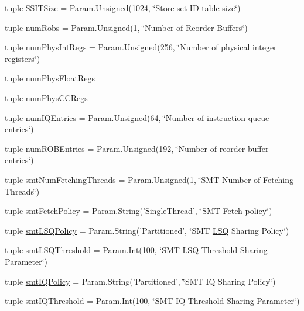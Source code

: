\begin{DoxyCompactItemize}
tuple \hyperlink{classO3CPU_1_1DerivO3CPU_aaae81435109fd5abd8db9e1cac852536}{SSITSize} = Param.Unsigned(1024, \char`\"{}Store set ID table size\char`\"{})
\item 
tuple \hyperlink{classO3CPU_1_1DerivO3CPU_afa45ebeb163c7058a6ba074b27187095}{numRobs} = Param.Unsigned(1, \char`\"{}Number of Reorder Buffers\char`\"{})
\item 
tuple \hyperlink{classO3CPU_1_1DerivO3CPU_a4872233fcf1f251c1065c07bf3d288b4}{numPhysIntRegs} = Param.Unsigned(256, \char`\"{}Number of physical integer registers\char`\"{})
\item 
tuple \hyperlink{classO3CPU_1_1DerivO3CPU_aa014e3ffbc9e5c2cdee9cd256bcb9a94}{numPhysFloatRegs}
\item 
tuple \hyperlink{classO3CPU_1_1DerivO3CPU_aae7d8cb15fc97d48c864e92f858edece}{numPhysCCRegs}
\item 
tuple \hyperlink{classO3CPU_1_1DerivO3CPU_a008b4cba2a3f283c5889144437338721}{numIQEntries} = Param.Unsigned(64, \char`\"{}Number of instruction queue entries\char`\"{})
\item 
tuple \hyperlink{classO3CPU_1_1DerivO3CPU_acb1025bcc322542b7e2fc418cd8d4308}{numROBEntries} = Param.Unsigned(192, \char`\"{}Number of reorder buffer entries\char`\"{})
\item 
tuple \hyperlink{classO3CPU_1_1DerivO3CPU_a49914e72e327c9059bed92c4095a120f}{smtNumFetchingThreads} = Param.Unsigned(1, \char`\"{}SMT Number of Fetching Threads\char`\"{})
\item 
tuple \hyperlink{classO3CPU_1_1DerivO3CPU_a349052a4ccb84410a8e2ae982cdf1bbc}{smtFetchPolicy} = Param.String('SingleThread', \char`\"{}SMT Fetch policy\char`\"{})
\item 
tuple \hyperlink{classO3CPU_1_1DerivO3CPU_aa002a74d5cf338da61e3e35bfcc19fa0}{smtLSQPolicy} = Param.String('Partitioned', \char`\"{}SMT \hyperlink{classLSQ}{LSQ} Sharing Policy\char`\"{})
\item 
tuple \hyperlink{classO3CPU_1_1DerivO3CPU_a7f52774912af5111096695b4fe368e00}{smtLSQThreshold} = Param.Int(100, \char`\"{}SMT \hyperlink{classLSQ}{LSQ} Threshold Sharing Parameter\char`\"{})
\item 
tuple \hyperlink{classO3CPU_1_1DerivO3CPU_a09ad04b0a2fee606eff57ec604445dbb}{smtIQPolicy} = Param.String('Partitioned', \char`\"{}SMT IQ Sharing Policy\char`\"{})
\item 
tuple \hyperlink{classO3CPU_1_1DerivO3CPU_ab239c1e3b71d524ffdc9147b9bb85383}{smtIQThreshold} = Param.Int(100, \char`\"{}SMT IQ Threshold Sharing Parameter\char`\"{})

\end{DoxyCompactItemize}
